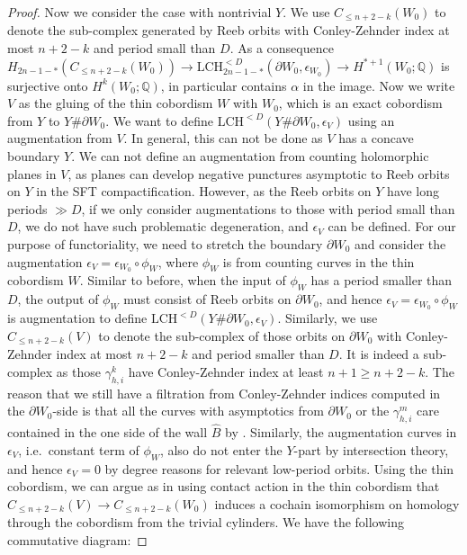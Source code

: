 \documentclass[11pt]{amsart}
\numberwithin{equation}{section}
\def\Q{{\mathbb Q}}
\begin{document}
\begin{proof}
Now we consider the case with nontrivial $Y$. We use $C_{\le n+2-k}(W_0)$ to denote the sub-complex generated by Reeb orbits with Conley-Zehnder index at most $n+2-k$ and period small than $D$. As a consequence $H_{2n-1-*}(C_{\le n+2-k}(W_0))\to \mathrm{LCH}^{<D}_{2n-1-*}(\partial W_0, \epsilon_{W_0}) \to H^{*+1}(W_0;\Q)$ is surjective onto $H^k(W_0;\Q)$, in particular contains $\alpha$ in the image. Now we write $V$ as the gluing of the thin cobordism $W$ with $W_0$, which is an exact cobordism from $Y$ to $Y\#\partial W_0$. We want to define $\mathrm{LCH}^{<D}(Y\#\partial W_0,\epsilon_V)$ using an augmentation from $V$. In general, this can not be done as $V$ has a concave boundary $Y$. We can not define an augmentation from counting holomorphic planes in $V$, as planes can develop negative punctures asymptotic to Reeb orbits on $Y$ in the SFT compactification. However, as the Reeb orbits on $Y$ have long periods $\gg D$, if we only consider augmentations to those with period small than $D$, we do not have such problematic degeneration, and $\epsilon_V$ can be defined. For our purpose of functoriality, we need to stretch the boundary $\partial W_0$ and consider the augmentation $\epsilon_V=\epsilon_{W_0}\circ \phi_W$, where $\phi_W$ is from counting curves in the thin cobordism $W$. Similar to before, when the input of $\phi_W$ has a period smaller than $D$, the output of $\phi_W$ must consist of Reeb orbits on $\partial W_0$, and hence $\epsilon_V=\epsilon_{W_0}\circ \phi_W$ is augmentation to define $\mathrm{LCH}^{<D}(Y\#\partial W_0,\epsilon_V)$. Similarly, we use $C_{\le n+2-k}(V)$ to denote the sub-complex of those orbits on $\partial W_0$ with Conley-Zehnder index at most $n+2-k$ and period smaller than $D$. It is indeed a sub-complex as those $\gamma^{k}_{h,i}$ have Conley-Zehnder index at least $n+1\ge n+2-k$. The reason that we still have a filtration from Conley-Zehnder indices computed in the $\partial W_0$-side is that all the curves with asymptotics from $\partial W_0$ or the $\gamma_{h,i}^m$ care contained in the one side of the wall $\widehat{B}$ by . Similarly, the augmentation curves in $\epsilon_V$, i.e.\ constant term of $\phi_W$, also do not enter the $Y$-part by intersection theory, and hence $\epsilon_V=0$ by degree reasons for relevant low-period orbits. Using the thin cobordism, we can argue as in \cite[\S 4.2]{+1} using contact action in the thin cobordism that $C_{\le n+2-k}(V)\to C_{\le n+2-k}(W_0)$ induces a cochain isomorphism on homology through the cobordism from the trivial cylinders. We have the following commutative diagram:

\end{proof}
\end{document}
